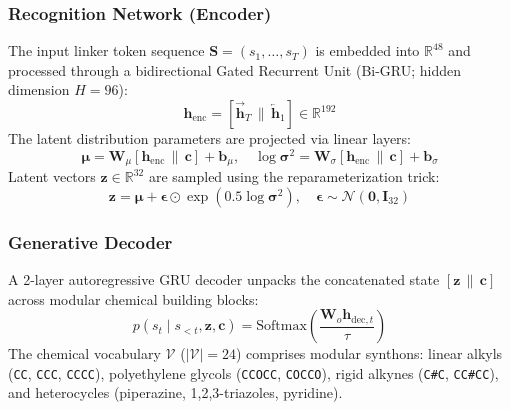 \documentclass[conference]{IEEEtran}
\begin{document}
\subsubsection{Recognition Network (Encoder)}
The input linker token sequence $\mathbf{S} = (s_1, \dots, s_T)$ is embedded into $\mathbb{R}^{48}$ and processed through a bidirectional Gated Recurrent Unit (Bi-GRU; hidden dimension $H = 96$):
\begin{equation}
\mathbf{h}_{\text{enc}} = [\overrightarrow{\mathbf{h}}_T \,\|\, \overleftarrow{\mathbf{h}}_1] \in \mathbb{R}^{192}
\end{equation}
The latent distribution parameters are projected via linear layers:
\begin{equation}
\boldsymbol{\mu} = \mathbf{W}_\mu [\mathbf{h}_{\text{enc}} \,\|\, \mathbf{c}] + \mathbf{b}_\mu, \quad \log \boldsymbol{\sigma}^2 = \mathbf{W}_\sigma [\mathbf{h}_{\text{enc}} \,\|\, \mathbf{c}] + \mathbf{b}_\sigma
\end{equation}
Latent vectors $\mathbf{z} \in \mathbb{R}^{32}$ are sampled using the reparameterization trick:
\begin{equation}
\mathbf{z} = \boldsymbol{\mu} + \boldsymbol{\epsilon} \odot \exp(0.5 \log \boldsymbol{\sigma}^2), \quad \boldsymbol{\epsilon} \sim \mathcal{N}(\mathbf{0}, \mathbf{I}_{32})
\end{equation}

\subsubsection{Generative Decoder}
A 2-layer autoregressive GRU decoder unpacks the concatenated state $[\mathbf{z} \,\|\, \mathbf{c}]$ across modular chemical building blocks:
\begin{equation}
p(s_t \mid s_{<t}, \mathbf{z}, \mathbf{c}) = \text{Softmax}\left(\frac{\mathbf{W}_o \mathbf{h}_{\text{dec}, t}}{\tau}\right)
\end{equation}
The chemical vocabulary $\mathcal{V}$ ($|\mathcal{V}| = 24$) comprises modular synthons: linear alkyls (\texttt{CC}, \texttt{CCC}, \texttt{CCCC}), polyethylene glycols (\texttt{CCOCC}, \texttt{COCCO}), rigid alkynes (\texttt{C\#C}, \texttt{CC\#CC}), and heterocycles (piperazine, 1,2,3-triazoles, pyridine).
\end{document}
